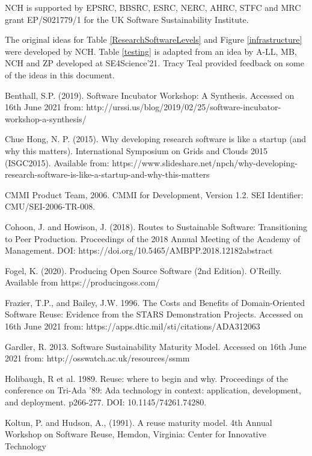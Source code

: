 \documentclass[conference]{IEEEtran}
\begin{document}
NCH is supported by EPSRC, BBSRC, ESRC, NERC, AHRC, STFC and MRC grant EP/S021779/1 for the UK Software Sustainability Institute.

The original ideas for Table \ref{ResearchSoftwareLevels} and Figure \ref{infrastructure} were developed by NCH. Table \ref{testing} is adapted from an idea by A-LL, MB, NCH and ZP developed at SE4Science’21. Tracy Teal provided feedback on some of the ideas in this document.


\begin{thebibliography}{00}

 Benthall, S.P. (2019). Software Incubator Workshop: A Synthesis. Accessed on 16th June 2021 from: http://urssi.us/blog/2019/02/25/software-incubator-workshop-a-synthesis/

 Chue Hong, N. P. (2015). Why developing research software is like a startup (and why this matters). International Symposium on Grids and Clouds 2015 (ISGC2015). Available from: https://www.slideshare.net/npch/why-developing-research-software-is-like-a-startup-and-why-this-matters

 CMMI Product Team, 2006. CMMI for Development, Version 1.2. SEI Identifier: CMU/SEI-2006-TR-008.

 Cohoon, J. and Howison, J. (2018). Routes to Sustainable Software: Transitioning to Peer Production. Proceedings of the 2018 Annual Meeting of the Academy of Management. DOI: https://doi.org/10.5465/AMBPP.2018.12182abstract
 
 Fogel, K. (2020). Producing Open Source Software (2nd Edition). O’Reilly. Available from https://producingoss.com/

 Frazier, T.P., and Bailey, J.W. 1996. The Costs and Benefits of Domain-Oriented Software Reuse: Evidence from the STARS Demonstration Projects. Accessed on 16th June 2021
from: https://apps.dtic.mil/sti/citations/ADA312063

 Gardler, R. 2013. Software Sustainability Maturity Model. Accessed on 16th June 2021 from: http://osswatch.ac.uk/resources/ssmm

 Holibaugh, R et al. 1989. Reuse: where to begin and why. Proceedings of the conference on Tri-Ada '89: Ada technology in context: application, development, and deployment. p266-277. DOI: 10.1145/74261.74280.

 Koltun, P. and Hudson, A., (1991). A reuse maturity model. 4th Annual Workshop on Software Reuse, Hemdon, Virginia: Center for Innovative Technology


\end{thebibliography}
\end{document}
